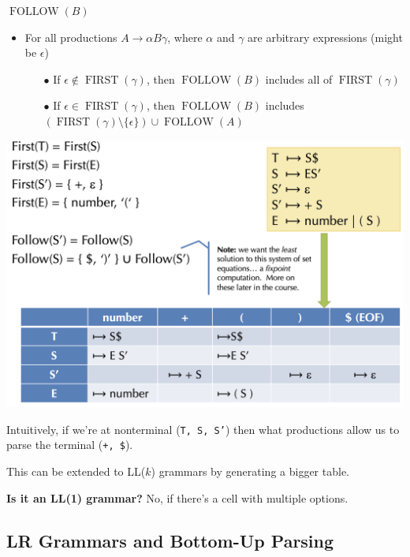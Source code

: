 \begin{algorithm} $\operatorname{FOLLOW}(B)$
\begin{itemize}
    \item For all productions $A \to \alpha B \gamma$, where $\alpha$ and $\gamma$ are arbitrary expressions (might be $\epsilon$)
    \begin{itemize}
        \item[$\bullet$] If $\epsilon \not \in \operatorname{FIRST}(\gamma)$, then $\operatorname{FOLLOW}(B)$ includes all of $\operatorname{FIRST}(\gamma)$
        \item[$\bullet$] If $\epsilon \in \operatorname{FIRST}(\gamma)$, then $\operatorname{FOLLOW}(B)$ includes $(\operatorname{FIRST}(\gamma) \setminus \{ \epsilon \} ) \cup \operatorname{FOLLOW}(A)$
    \end{itemize}
\end{itemize}
    
\end{algorithm}

\begin{center}
	\includegraphics[width=\linewidth]{assets/ll1.png}
\end{center}
\vspace{-10pt}
Intuitively, if we're at nonterminal (\texttt{T, S, S'}) then what productions allow us to parse the terminal (\texttt{+, \$}).

This can be extended to LL($k$) grammars by generating a bigger table.

\textbf{Is it an LL(1) grammar?} No, if there's a cell with multiple options.

\subsection*{LR Grammars and Bottom-Up Parsing}

